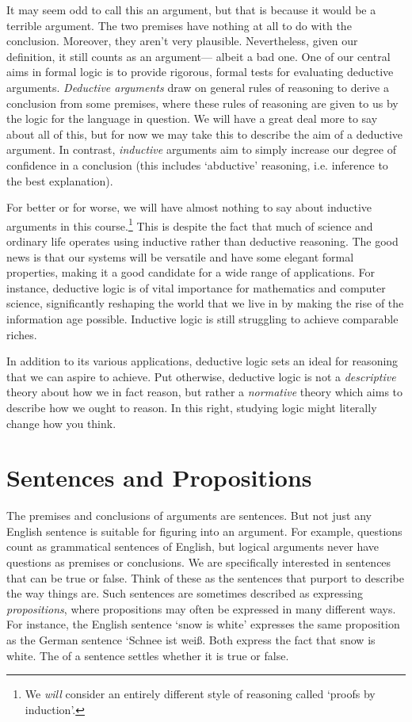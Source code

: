 It may seem odd to call this an argument, but that is because it would be a terrible argument.
The two premises have nothing at all to do with the conclusion.
Moreover, they aren't very plausible.
Nevertheless, given our definition, it still counts as an argument--- albeit a bad one.
One of our central aims in formal logic is to provide rigorous, formal tests for evaluating deductive arguments.
\textit{Deductive arguments} draw on general rules of reasoning to derive a conclusion from some premises, where these rules of reasoning are given to us by the logic for the language in question.
We will have a great deal more to say about all of this, but for now we may take this to describe the aim of a deductive argument.
In contrast, \textit{inductive} arguments aim to simply increase our degree of confidence in a conclusion (this includes `abductive' reasoning, i.e. inference to the best explanation). 

For better or for worse, we will have almost nothing to say about inductive arguments in this course.\footnote{We \textit{will} consider an entirely different style of reasoning called `proofs by induction'.}
This is despite the fact that much of science and ordinary life operates using inductive rather than deductive reasoning.
The good news is that our systems will be versatile and have some elegant formal properties, making it a good candidate for a wide range of applications.
For instance, deductive logic is of vital importance for mathematics and computer science, significantly reshaping the world that we live in by making the rise of the information age possible.
Inductive logic is still struggling to achieve comparable riches.

In addition to its various applications, deductive logic sets an ideal for reasoning that we can aspire to achieve.
Put otherwise, deductive logic is not a \textit{descriptive} theory about how we in fact reason, but rather a \textit{normative} theory which aims to describe how we ought to reason.
In this right, studying logic might literally change how you think.


\section{Sentences and Propositions}
\label{intro.sentences}

The premises and conclusions of arguments are sentences.
But not just any English sentence is suitable for figuring into an argument.
For example, questions count as grammatical sentences of English, but logical arguments never have questions as premises or conclusions.
We are specifically interested in sentences that can be true or false.
Think of these as the sentences that purport to describe the way things are.
Such sentences are sometimes described as expressing \emph{propositions}, where propositions may often be expressed in many different ways.
For instance, the English sentence `snow is white' expresses the same proposition as the German sentence `Schnee ist wei\ss.
Both express the fact that snow is white.
The  of a sentence settles whether it is true or false.

